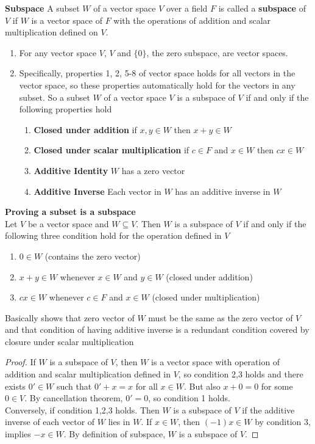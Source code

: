 \documentclass[11pt]{article}
\begin{document}
\begin{defn*}
    \textbf{Subspace} A subset $W$ of a vector space $V$ over a field $F$ is called a \textbf{subspace} of $V$ if $W$ is a vector space of $F$ with the operations of addition and scalar multiplication defined on $V$. 
    \begin{enumerate}
        \item For any vector space $V$, $V$ and $\{0\}$, the zero subspace, are vector spaces.
        \item  Specifically, properties 1, 2, 5-8 of vector space holds for all vectors in the vector space, so these properties automatically hold for the vectors in any subset. So a subset $W$ of a vector space $V$ is a subspace of $V$ if and only if the following properties hold
        \begin{enumerate}
            \item \textbf{Closed under addition} if $x,y\in W$ then $x+y\in W$
            \item \textbf{Closed under scalar multiplication} if $c\in F$ and $x\in W$ then $cx\in W$ 
            \item \textbf{Additive Identity} $W$ has a zero vector
            \item \textbf{Additive Inverse} Each vector in $W$ has an additive inverse in $W$
        \end{enumerate}
    \end{enumerate}
\end{defn*}


\begin{theorem*}
    \textbf{Proving a subset is a subspace} \\ 
    Let $V$ be a vector space and $W\subseteq V$. Then $W$ is a subspace of $V$ if and only if the following three condition hold for the operation defined in $V$
    \begin{enumerate}
        \item $0\in W$ (contains the zero vector)
        \item $x+y\in W$ whenever $x\in W$ and $y\in W$ (closed under addition)
        \item $cx\in W$ whenever $c\in F$ and $x\in W$ (closed under multiplication)
    \end{enumerate}
    Basically shows that zero vector of $W$ must be the same as the zero vector of $V$ and that condition of having additive inverse is a redundant condition covered by closure under scalar multiplication
    \begin{proof}
        If $W$ is a subspace of $V$, then $W$ is a vector space with operation of addition and scalar multiplication defined in $V$, so condition 2,3 holds and there exists $0' \in W$ such that $0' + x = x$ for all $x\in W$. But also $x+0=0$ for some $0\in V$. By cancellation theorem, $0'=0$, so condition 1 holds. \\
        Conversely, if condition 1,2,3 holds. Then $W$ is a subspace of $V$ if the additive inverse of each vector of $W$ lies in $W$. If $x\in W$, then $(-1)x \in W$ by condition 3, implies $-x \in W$. By definition of subspace, $W$ is a subspace of $V$. 
    \end{proof}
\end{theorem*}
\end{document}
